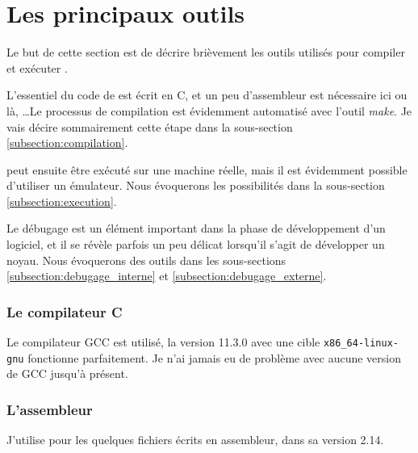 %
\section{Les principaux outils}

   Le but de cette section est de décrire brièvement les outils
utilisés pour compiler et exécuter \manux.

   L'essentiel du code de \manux est écrit en C, et un peu
d'assembleur est nécessaire ici ou là, \ldots Le processus de
compilation est évidemment automatisé avec l'outil {\em make}. Je vais
décire sommairement cette étape dans la sous-section
\ref{subsection:compilation}.

   \manux peut ensuite être exécuté sur une machine réelle, mais il
est évidemment possible d'utiliser un émulateur. Nous évoquerons les
possibilités dans la sous-section \ref{subsection:execution}.

   Le débugage est un élément important dans la phase de développement
d'un logiciel, et il se révèle parfois un peu délicat lorsqu'il s'agit
de développer un noyau. Nous évoquerons des outils dans les
sous-sections \ref{subsection:debugage_interne} et
\ref{subsection:debugage_externe}.

%
\subsubsection{Le compilateur C}

   Le compilateur GCC est utilisé, la version 11.3.0 avec une cible
\lstinline!x86_64-linux-gnu! fonctionne parfaitement. Je n'ai jamais
eu de problème avec aucune version de GCC jusqu'à présent.

%
\subsubsection{L'assembleur}

   J'utilise \nasm \autocite{nasm-website}  pour les quelques fichiers
écrits en assembleur, dans sa version 2.14.
 
